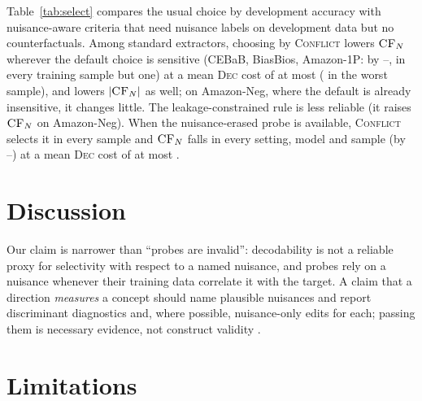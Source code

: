 \documentclass[11pt]{article}
\newcommand{\rhot}{\rho_{\text{tr}}}
\newcommand{\dec}{\textsc{Dec}}
\newcommand{\cfn}{\textsc{CF}_{N}}
\newcommand{\conf}{\textsc{Conflict}}
\newcommand{\leak}{\textsc{Leak}}
\begin{document}
\begin{table}[t]
\centering\small\setlength{\tabcolsep}{2pt}
\resizebox{\columnwidth}{!}{}
\caption{Selecting an extractor on development data at $\rhot=0.9$: test $\cfn$ (accepted edits) of the extractor chosen by maximal \dec{} (standard practice), maximal \conf{}, or minimal $|$\leak{}$|$ among extractors within 0.01 of the best development \dec{}; change in test \dec{} in parentheses. Means over 3 training samples; $^\dagger$: $\cfn$ did not fall in every sample. More criteria and Civil: Appendix~\ref{app:more}.}
\label{tab:select}
\end{table}

Table~\ref{tab:select} compares the usual choice by development accuracy with nuisance-aware criteria that need nuisance labels on development data but no counterfactuals. Among standard extractors, choosing by \conf{} lowers $\cfn$ wherever the default choice is sensitive (CEBaB, BiasBios, Amazon-1P: by \selSensConfCFmin--\selSensConfCFmax, in every training sample but one) at a mean \dec{} cost of at most \selSensConfDecMeanWorst{} (\selSensConfDecWorst{} in the worst sample), and lowers $|\cfn|$ as well; on Amazon-Neg, where the default is already insensitive, it changes little. The leakage-constrained rule is less reliable (it raises $\cfn$ on Amazon-Neg). When the nuisance-erased probe is available, \conf{} selects it in every sample and $\cfn$ falls in every setting, model and sample (by \selFullConfCFmin--\selFullConfCFmax) at a mean \dec{} cost of at most \selFullConfDecMeanWorst.

\section{Discussion}

Our claim is narrower than ``probes are invalid'': decodability is not a reliable proxy for selectivity with respect to a named nuisance, and probes rely on a nuisance whenever their training data correlate it with the target. A claim that a direction \emph{measures} a concept should name plausible nuisances and report discriminant diagnostics and, where possible, nuisance-only edits for each; passing them is necessary evidence, not construct validity \citep{messick1995validity,licht2025measuring}.

\section*{Limitations}
\end{document}
